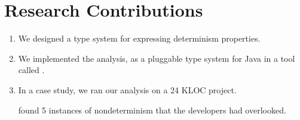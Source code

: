 \section{Research Contributions\label{sec:contributions}}
\begin{enumerate}
  \item We designed a type system for expressing determinism properties.

  \item We implemented the analysis, as a pluggable type system for Java in a
    tool called \theDeterminismChecker.

  \item In a case study, we ran our analysis on a 24 KLOC project.
  
    \TheDeterminismChecker
    found 5 instances of nondeterminism that the developers had
    overlooked.
\end{enumerate}


